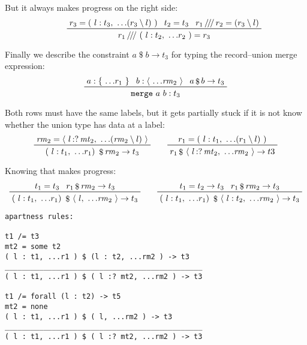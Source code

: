 \documentclass[11pt, twoside, reqno]{book}
\providecommand{\lcurvyangle}{\langle}
\providecommand{\rcurvyangle}{\rangle}
\begin{document}
But it always makes progress on the right side:
\begin{displaymath}
\qquad
\prftree
  {r_3 = (\ l : t_3,\ \dots\!(r_3 \setminus l)\ )}
  {t_2 = t_3}
  {r_1 \mathop{/\!/\!/} r_2 = (r_3 \setminus l)}
  {r_1 \mathop{/\!/\!/}\ (\ l : t_2,\ \dots\!r_2\ ) = r_3}
\end{displaymath}

Finally we describe the constraint \(a \mathop{\$} b \to t_3\) for typing the record--union merge expression:
\begin{displaymath}
\prftree{a : \{\ \dots\!r_1\ \}}{b : \langle\ \dots\!\mathit{rm}_2\ \rangle}{a \mathop{\$} b \to t_3}{\texttt{merge}\ a\ b : t_3}
\end{displaymath}

Both rows must have the same labels, but it gets partially stuck if it is not know whether the union type has data at a label:
\begin{displaymath}
\prftree{\mathit{rm}_2 = \lcurvyangle\ l \mathop{{:}{?}} \mathit{mt}_2,\ \dots\!(\mathit{rm}_2 \setminus l)\ \rcurvyangle}{(\ l : t_1,\ \dots\!r_1 )\ \mathop{\$} \mathit{rm}_2 \to t_3}
\qquad
\prftree{r_1 = (\ l : t_1,\ \dots\!(r_1 \setminus l)\ )}{r_1 \mathop{\$}\ \lcurvyangle\ l \mathop{{:}{?}} \mathit{mt}_2,\ \dots\!\mathit{rm}_2\ \rcurvyangle \to t3}
\end{displaymath}

Knowing that makes progress:
\begin{displaymath}
\prftree{t_1 = t_3}{r_1 \mathop{\$} \mathit{rm}_2 \to t_3}
  {(\ l : t_1,\ \dots\!r_1 )\ \mathop{\$}\ \lcurvyangle\ l,\ \dots\!\mathit{rm}_2\ \rcurvyangle \to t_3}
\qquad
\prftree{t_1 = t_2 \to t_3}{r_1 \mathop{\$} \mathit{rm}_2 \to t_3}
  {(\ l : t_1,\ \dots\!r_1 )\ \mathop{\$}\ \lcurvyangle\ l : t_2,\ \dots\!\mathit{rm}_2\ \rcurvyangle \to t_3}
\end{displaymath}

\begin{verbatim}
apartness rules:

t1 /= t3
mt2 = some t2
( l : t1, ...r1 ) $ (l : t2, ...rm2 ) -> t3
______________________________________________
( l : t1, ...r1 ) $ ( l :? mt2, ...rm2 ) -> t3

t1 /= forall (l : t2) -> t5
mt2 = none
( l : t1, ...r1 ) $ ( l, ...rm2 ) -> t3
______________________________________________
( l : t1, ...r1 ) $ ( l :? mt2, ...rm2 ) -> t3
\end{verbatim}


%
%
%
%
\end{document}
